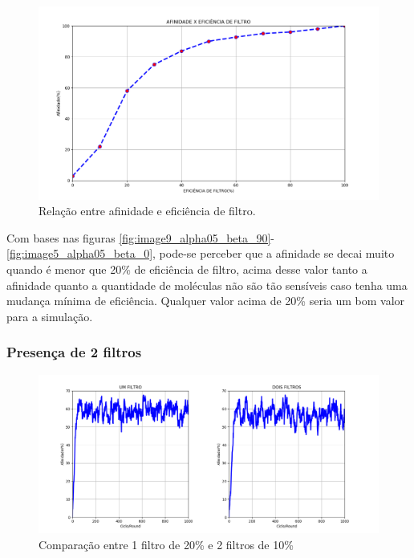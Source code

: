 \begin{figure}[!h]
    \centering
    \includegraphics[width=15cm]{figures/affinity_filter.png}
    \caption{Relação entre afinidade e eficiência de filtro.}
    \label{fig:affinity_filter}
\end{figure}

\newpage
Com bases nas figuras \ref{fig:image9_alpha05_beta_90}-\ref{fig:image5_alpha05_beta_0}, pode-se perceber que a afinidade se decai muito
quando é menor que 20\% de eficiência de filtro, acima desse valor tanto a afinidade
quanto a quantidade de moléculas não são tão sensíveis caso tenha uma mudança mínima
de eficiência. Qualquer valor acima de 20\% seria um bom valor para a simulação. 

\subsubsection{Presença de 2 filtros}

\begin{figure}[!h]
    \centering
    \includegraphics[width=15cm]{figures/image14_alpha05_beta_1de20_e_2de10.png}
    \caption{Comparação entre 1 filtro de 20\%  e 2 filtros de 10\%}
    \label{fig:image14_alpha05_beta_1de20_e_2de10}
\end{figure}
\newpage

